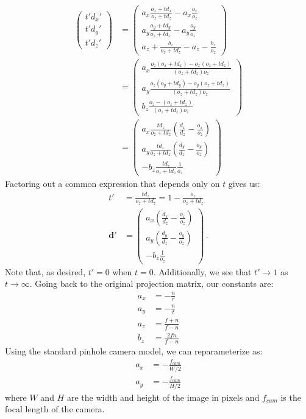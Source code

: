 \begin{align}
    \begin{pmatrix}
        t' d_x' \\
        t' d_y' \\
        t' d_z' 
    \end{pmatrix}
    &=
    \begin{pmatrix}
        a_x \frac{o_x + t d_x}{o_z + t d_z} - a_x \frac{o_x}{o_z} \\[6pt]
        a_y \frac{o_y + t d_y}{o_z + t d_z} - a_y \frac{o_y}{o_z} \\[6pt]
        a_z + \frac{b_z}{o_z + t d_z} - a_z - \frac{b_z}{o_z}
    \end{pmatrix} \\[6pt]
    &=
    \begin{pmatrix}
        a_x \frac{o_z(o_x + t d_x) - o_x(o_z + t d_z)}{(o_z + t d_z)o_z} \\[6pt]
        a_y \frac{o_z(o_y + t d_y) - o_y(o_z + t d_z)}{(o_z + t d_z)o_z} \\[6pt]
        b_z\frac{o_z - (o_z + t d_z)}{(o_z + t d_z)o_z}
    \end{pmatrix} \\[6pt]
    &= 
    \begin{pmatrix}
        a_x \frac{t d_z}{o_z + t d_z} \left(\frac{d_x}{d_z} - \frac{o_x}{o_z}\right) \\[6pt]
        a_y \frac{t d_z}{o_z + t d_z} \left(\frac{d_y}{d_z} - \frac{o_y}{o_z}\right) \\[6pt]
        -b_z \frac{t d_z}{o_z + t d_z} \frac{1}{o_z}
    \end{pmatrix} 
\end{align}
Factoring out a common expression that depends only on $t$ gives us:
\begin{align}
    t' &= \frac{t d_z}{o_z + t d_z} = 1 - \frac{o_z}{o_z + t d_z} \\[6pt]
    \mathbf d' &= 
    \begin{pmatrix}
        a_x \left(\frac{d_x}{d_z} - \frac{o_x}{o_z}\right) \\[6pt]
        a_y \left(\frac{d_y}{d_z} - \frac{o_y}{o_z}\right) \\[6pt]
        -b_z \frac{1}{o_z}
    \end{pmatrix} \,. 
\end{align}
Note that, as desired, $t'=0$ when $t=0$. Additionally, we see that $t' \to 1$ as $t \to \infty$. Going back to the original projection matrix, our constants are:
\begin{align}
    a_x &= -\frac{n}{r} \\
    a_y &= -\frac{n}{t} \\
    a_z &= \frac{f+n}{f-n} \\
    b_z &= \frac{2fn}{f-n} 
\end{align}
Using the standard pinhole camera model, we can reparameterize as:
\begin{align}
    a_x &= -\frac{f_{cam}}{W/2} \\
    a_y &= -\frac{f_{cam}}{H/2} 
\end{align}
where $W$ and $H$ are the width and height of the image in pixels and $f_{cam}$ is the focal length of the camera. 

